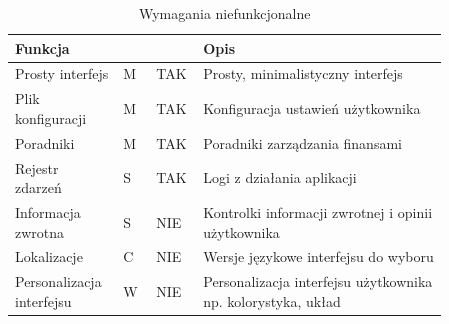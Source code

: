 \documentclass[a4paper, 10pt, twoside, openright]{report}
\newcommand{\customstyletable}[1]{\footnotesize{\textbf{#1}}}
\newcommand{\customstyletablecentered}[1]{\footnotesize\centering{\textbf{#1}}}
\begin{document}
\begin{large}
\begin{table}[H] %
    \caption{Wymagania niefunkcjonalne}
    \label{Wymagania niefunkcjonalne}
    \footnotesize
    \begin{tabular}{|p{0.2\linewidth}|p{0.07\linewidth}|p{0.07\linewidth}|p{0.52\linewidth}|}  %
    \hline                  %
    \customstyletable{Funkcja} & \customstyletablecentered{PRIO} & \customstyletablecentered{IMPL}& \customstyletable{Opis} \\
    \hline
    {Prosty interfejs} & {M} & {TAK} & {Prosty, minimalistyczny interfejs}\\
    \hline
    {Plik konfiguracji} & {M} & {TAK} & {Konfiguracja ustawień użytkownika}\\
    \hline
    {Poradniki} & {M} & {TAK} & {Poradniki zarządzania finansami}\\
    \hline
    {Rejestr zdarzeń} & {S} & {TAK} & {Logi z działania aplikacji}\\
    \hline
    {Informacja zwrotna} & {S} & {NIE} & {Kontrolki informacji zwrotnej i opinii użytkownika}\\
    \hline
    {Lokalizacje} & {C} & {NIE} & {Wersje językowe interfejsu do wyboru}\\
    \hline
    {Personalizacja interfejsu} & {W} & {NIE} & {Personalizacja interfejsu użytkownika np. kolorystyka, układ}\\
    \hline
    \end{tabular}
\end{table}


\end{large}
\end{document}
